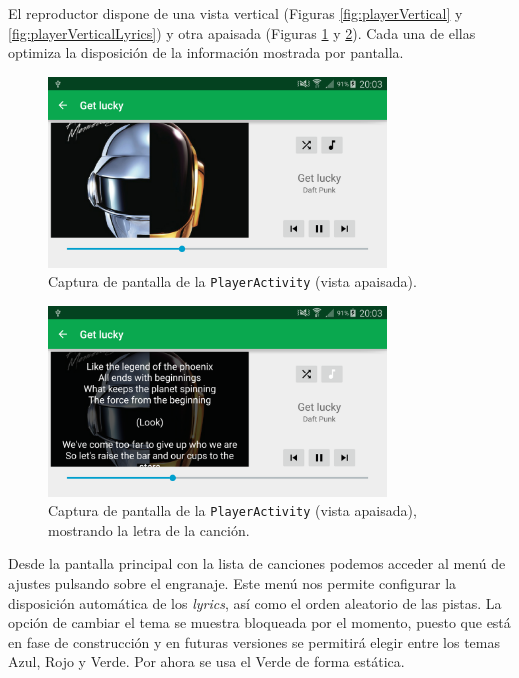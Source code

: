 \documentclass[10pt,a4paper]{article}
\begin{document}
El reproductor dispone de una vista vertical (Figuras \ref{fig:playerVertical} y \ref{fig:playerVerticalLyrics}) y otra apaisada (Figuras \ref{fig:horizontal} y \ref{fig:horizontal_lyrics}). Cada una de ellas optimiza la disposición de la información mostrada por pantalla.\\


\begin{figure}[htbp]
	\centering
		\includegraphics[width=0.8\textwidth]{capturas/PlayerHorizontal.png}
	\caption{Captura de pantalla de la \texttt{PlayerActivity} (vista apaisada).}
	\label{fig:horizontal}
\end{figure}

\begin{figure}[htbp]
	\centering
		\includegraphics[width=0.8\textwidth]{capturas/PlayerHorizontalLyrics.png}
	\caption{Captura de pantalla de la \texttt{PlayerActivity} (vista apaisada), mostrando la letra de la canción.}
	\label{fig:horizontal_lyrics}
\end{figure}

Desde la pantalla principal con la lista de canciones podemos acceder al menú de ajustes pulsando sobre el engranaje. Este menú nos permite configurar la disposición automática de los \textit{lyrics}, así como el orden aleatorio de las pistas. La opción de cambiar el tema se muestra bloqueada por el momento, puesto que está en fase de construcción y en futuras versiones se permitirá elegir entre los temas Azul, Rojo y Verde. Por ahora se usa el Verde de forma estática.\\
\end{document}
